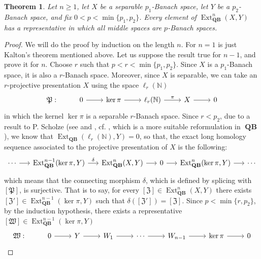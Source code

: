 \documentclass[12pt,a4paper]{amsproc}
\newtheorem{thm}{Theorem}[section]
\theoremstyle{remark}
\theoremstyle{definition}
\newcommand{\Ext}{\operatorname{Ext}}
\newcommand{\QBan}{\operatorname{\textbf{QB}}}
\numberwithin{equation}{section}
\begin{document}
\begin{thm}\label{thm:stability-qban}
Let $n \ge 1$, let $X$ be a separable $p_1$-Banach space, let $Y$ be a $p_2$-Banach space, and fix $0 < p < \min\{p_1, p_2\}$. Every element of $\Ext^n_{\QBan}(X,Y)$ has a representative in which all middle spaces are $p$-Banach spaces.
\end{thm}
\begin{proof}
    We will do the proof by induction on the length $n$. For $n=1$ is just Kalton's theorem mentioned above. Let us suppose the result true for $n-1$, and prove it for $n$. Choose $r$ such that $p<r<\min\lbrace p_1, p_2 \rbrace$. Since $X$ is a $p_1$-Banach space, it is also a $r$-Banach space. Moreover, since $X$ is separable, we can take an $r$-projective presentation $X$ using the space $\ell_r(\mathbb{N})$
    \[ 
\begin{tikzcd}
    \mathfrak{P}: & 0 \arrow[r] & \ker \pi \arrow[r] & \ell_r(\mathbb{N}) \arrow[r, "\pi"] & X \arrow[r] & 0 
\end{tikzcd}
\]
in which the kernel $\ker \pi$ is a separable $r$-Banach space. Since $r <p_2$, due to a result to P. Scholze (see \cite[Theorem 1.1]{scholze2} and \cite[Remark 8.15]{scholze1}, cf.  \cite{scholze3}, which is a more suitable reformulation in $\QBan$), we know that $\Ext_{\QBan}(\ell_r(\mathbb{N}),Y)=0$, so that, the exact long homology sequence associated to the projective presentation of $X$ is the following:
\begin{equation}
    \begin{tikzcd}[column sep=1.5em]
\cdots \arrow[r] & {\Ext_{\QBan}^{n-1}(\ker \pi,Y)} \arrow[r, "\delta"] & {\Ext^n_{\QBan}(X,Y)} \arrow[r] & 0 \arrow[r] & {\Ext_{\QBan}^{n}(\ker \pi,Y)} \arrow[r] & \cdots
\end{tikzcd}
\end{equation}
which means that the connecting morphism $\delta$, which is defined by splicing with $[\mathfrak{P}]$, is surjective. That is to say, for every $[\mathfrak{Z}] \in \Ext^n_{\QBan}(X,Y)$ there exists $[\mathfrak{Z'}] \in \Ext_{\QBan}^{n-1}(\ker \pi,Y)$ such that $\delta([\mathfrak{Z'}])=[\mathfrak{Z}]$. Since $p < \min\lbrace r,p_2 \rbrace$, by the induction hypothesis, there exists a representative $[\mathfrak{W}] \in \Ext_{\QBan}^{n-1}(\ker \pi ,Y)$
\begin{equation}
    \notag
    \begin{tikzcd}
    \mathfrak{W}: & 0 \arrow[r] & Y \arrow[r] & W_1 \arrow[r] & \cdots \arrow[r] & W_{n-1} \arrow[r] & \ker \pi \arrow[r] & 0 
\end{tikzcd}

\end{equation}
\end{proof}
\end{document}
